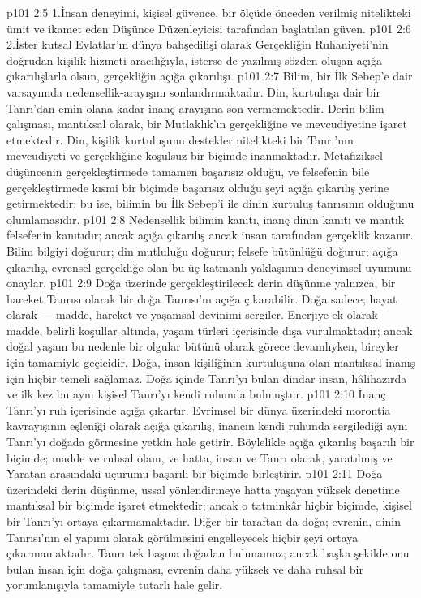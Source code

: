 \vs p101 2:5 1.\bibnobreakspace İnsan deneyimi, kişisel güvence, bir ölçüde önceden verilmiş nitelikteki ümit ve ikamet eden Düşünce Düzenleyicisi tarafından başlatılan güven.
\vs p101 2:6 2.\bibnobreakspace İster kutsal Evlatlar’ın dünya bahşedilişi olarak Gerçekliğin Ruhaniyeti’nin doğrudan kişilik hizmeti aracılığıyla, isterse de yazılmış sözden oluşan açığa çıkarılışlarla olsun, gerçekliğin açığa çıkarılışı.
\vs p101 2:7 Bilim, bir İlk Sebep’e dair varsayımda nedensellik\hyp{}arayışını sonlandırmaktadır. Din, kurtuluşa dair bir Tanrı’dan emin olana kadar inanç arayışına son vermemektedir. Derin bilim çalışması, mantıksal olarak, bir Mutlaklık’ın gerçekliğine ve mevcudiyetine işaret etmektedir. Din, kişilik kurtuluşunu destekler nitelikteki bir Tanrı’nın mevcudiyeti ve gerçekliğine koşulsuz bir biçimde inanmaktadır. Metafiziksel düşüncenin gerçekleştirmede tamamen başarısız olduğu, ve felsefenin bile gerçekleştirmede kısmi bir biçimde başarısız olduğu şeyi açığa çıkarılış yerine getirmektedir; bu ise, bilimin bu İlk Sebep’i ile dinin kurtuluş tanrısının  olduğunu olumlamasıdır.
\vs p101 2:8 Nedensellik bilimin kanıtı, inanç dinin kanıtı ve mantık felsefenin kanıtıdır; ancak açığa çıkarılış ancak insan  tarafından gerçeklik kazanır. Bilim bilgiyi doğurur; din mutluluğu doğurur; felsefe bütünlüğü doğurur; açığa çıkarılış, evrensel gerçekliğe olan bu üç katmanlı yaklaşımın deneyimsel uyumunu onaylar.
\vs p101 2:9 Doğa üzerinde gerçekleştirilecek derin düşünme yalnızca, bir hareket Tanrısı olarak bir doğa Tanrısı’nı açığa çıkarabilir. Doğa sadece; hayat olarak --- madde, hareket ve yaşamsal devinimi sergiler. Enerjiye ek olarak madde, belirli koşullar altında, yaşam türleri içerisinde dışa vurulmaktadır; ancak doğal yaşam bu nedenle bir olgular bütünü olarak görece devamlıyken, bireyler için tamamiyle geçicidir. Doğa, insan\hyp{}kişiliğinin kurtuluşuna olan mantıksal inanış için hiçbir temeli sağlamaz. Doğa içinde Tanrı’yı bulan dindar insan, hâlihazırda ve ilk kez bu aynı kişisel Tanrı’yı kendi ruhunda bulmuştur.
\vs p101 2:10 İnanç Tanrı’yı ruh içerisinde açığa çıkartır. Evrimsel bir dünya üzerindeki morontia kavrayışının eşleniği olarak açığa çıkarılış, inancın kendi ruhunda sergilediği aynı Tanrı’yı doğada görmesine yetkin hale getirir. Böylelikle açığa çıkarılış başarılı bir biçimde; madde ve ruhsal olanı, ve hatta, insan ve Tanrı olarak, yaratılmış ve Yaratan arasındaki uçurumu başarılı bir biçimde birleştirir.
\vs p101 2:11 Doğa üzerindeki derin düşünme, ussal yönlendirmeye hatta yaşayan yüksek denetime mantıksal bir biçimde işaret etmektedir; ancak o tatminkâr hiçbir biçimde, kişisel bir Tanrı’yı ortaya çıkarmamaktadır. Diğer bir taraftan da doğa; evrenin, dinin Tanrısı’nın el yapımı olarak görülmesini engelleyecek hiçbir şeyi ortaya çıkarmamaktadır. Tanrı tek başına doğadan bulunamaz; ancak başka şekilde onu bulan insan için doğa çalışması, evrenin daha yüksek ve daha ruhsal bir yorumlanışıyla tamamiyle tutarlı hale gelir.
